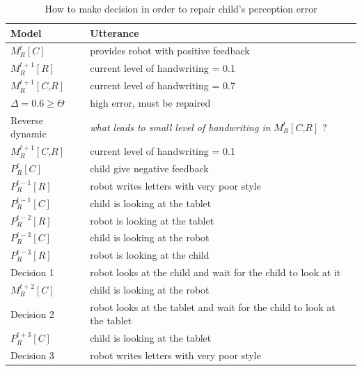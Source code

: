 \documentclass[10pt,a4paper]{article}
\begin{document}
\begin{table}
\centering
\renewcommand{\arraystretch}{1.5}
\begin{tabular}{|l|l|}
\hline
\textbf{Model} & \textbf{Utterance}\\
\hline
$M^{t}_R\left[\textit{C}\right]$ & provides robot with positive feedback\\
\hline
$M^{t+1}_R\left[\textit{R}\right]$ & current level of handwriting = 0.1\\
\hline
$M^{t+1}_R\left[\textit{C,R}\right]$ & current level of handwriting = 0.7\\
\hline
$\Delta=0.6 \geq \Theta$ & high error, must be repaired\\
\hline
Reverse dynamic & \textit{what leads to small level of handwriting in} $M^{t}_R\left[\textit{C,R}\right]$ ?\\
\hline
$M^{t+1}_R\left[\textit{C,R}\right]$ & current level of handwriting = 0.1\\
\hline
$P^{t}_R\left[\textit{C}\right]$ & child give negative feedback\\
\hline
$P^{t-1}_R\left[\textit{R}\right]$ & robot writes letters with very poor style\\
\hline
$P^{t-1}_R\left[\textit{C}\right]$ & child is looking at the tablet\\
\hline
$P^{t-2}_R\left[\textit{R}\right]$ & robot is looking at the tablet\\
\hline
$P^{t-2}_R\left[\textit{C}\right]$ & child is looking at the robot\\
\hline
$P^{t-3}_R\left[\textit{R}\right]$ & robot is looking at the child\\
\hline
Decision 1 & robot looks at the child and wait for the child to look at it\\
\hline
$M^{t+2}_R\left[\textit{C}\right]$ & child is looking at the robot\\
\hline
Decision 2 & robot looks at the tablet and wait for the child to look at the tablet\\
\hline
$P^{t+3}_R\left[\textit{C}\right]$ & child is looking at the tablet\\
\hline
Decision 3 & robot writes letters with very poor style\\
\hline
\end{tabular}
\caption{How to make decision in order to repair child's perception error}
\label{child_err_2}
\end{table}
\end{document}
